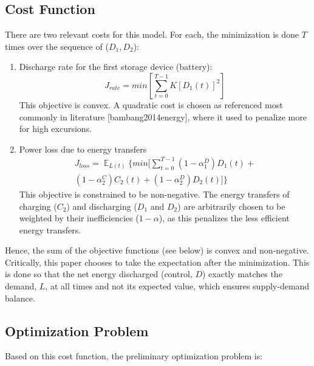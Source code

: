 \documentclass[conference]{IEEEtran}
\DeclareMathOperator{\E}{\mathbb{E}}
\begin{document}
\subsection{Cost Function}
There are two relevant costs for this model. For each, the minimization is done $T$ times over the sequence of ($D_{1},D_{2}$):
\begin{enumerate}
    \item Discharge rate for the first storage device (battery):
	\begin{equation}J_{rate}=min\left[\sum_{t=0}^{T-1}K\left[D_{1}(t)\right]^{2}\right]\end{equation}
	This objective is convex. A quadratic cost is chosen as referenced most commonly in literature [bambang2014energy], where it used to penalize more for high excursions.
	\item Power loss due to energy transfers
	\begin{multline}
    J_{loss}=\mathop{\E}_{L(t)} \Biggl\{min[\sum_{t=0}^{T-1}
	(1-\alpha_{1}^{D})D_{1}(t)+\\
	(1-\alpha_{2}^{C})C_{2}(t)+
	(1-\alpha_{2}^{D})D_{2}(t)
	]\Biggr\}\end{multline}
	This objective is constrained to be non-negative. The energy transfers of charging ($C_{2}$) and discharging ($D_{1}$ and $D_{2}$) are arbitrarily chosen to be weighted by their inefficiencies ($1-\alpha$), as this penalizes the less efficient energy transfers.
\end{enumerate}

Hence, the sum of the objective functions (see below) is convex and non-negative. Critically, this paper chooses to take the expectation after the minimization. This is done so that the net energy discharged (control, $D$) exactly matches the demand, $L$, at all times and not its expected value, which ensures supply-demand balance.

\subsection{Optimization Problem}
Based on this cost function, the preliminary optimization problem is:
\end{document}
